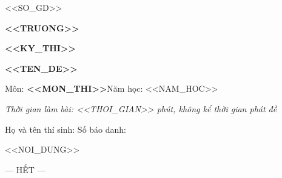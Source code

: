 \documentclass[12pt,a4paper]{article}
\begin{document}
\noindent\begin{minipage}[t]{0.45\textwidth}\centering
	{<<SO_GD>>\par}
	{\bfseries <<TRUONG>>\par}
\end{minipage}\hfill
\begin{minipage}[t]{0.53\textwidth}\centering
	{\bfseries <<KY_THI>>\par}
	{\bfseries <<TEN_DE>>\par}
	{Môn: \textbf{<<MON_THI>>}\quad Năm học: <<NAM_HOC>>\par}
	{\itshape Thời gian làm bài: <<THOI_GIAN>> phút, không kể thời gian phát đề\par}
\end{minipage}
\par\medskip
\noindent Họ và tên thí sinh: \dotfill\quad Số báo danh: \makebox[3cm]{\dotfill}\quad {}
\par\medskip
<<NOI_DUNG>>
\par\medskip\centerline{--- HẾT ---}
\end{document}

